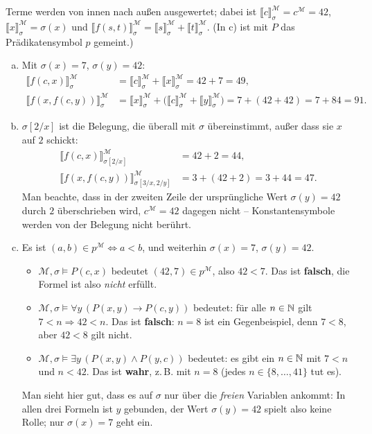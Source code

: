 \begin{loesung}
Terme werden von innen nach außen ausgewertet; dabei ist $\llbracket c\rrbracket^\mathcal{M}_\sigma=c^\mathcal{M}=42$, $\llbracket x\rrbracket^\mathcal{M}_\sigma=\sigma(x)$ und $\llbracket f(s,t)\rrbracket^\mathcal{M}_\sigma=\llbracket s\rrbracket^\mathcal{M}_\sigma+\llbracket t\rrbracket^\mathcal{M}_\sigma$. (In c) ist mit $P$ das Prädikatensymbol $p$ gemeint.)

\begin{enumerate}[a)]
  \item Mit $\sigma(x)=7$, $\sigma(y)=42$:
  \begin{align*}
    \llbracket f(c,x)\rrbracket^\mathcal{M}_\sigma &= \llbracket c\rrbracket^\mathcal{M}_\sigma+\llbracket x\rrbracket^\mathcal{M}_\sigma = 42+7 = 49,\\
    \llbracket f(x,f(c,y))\rrbracket^\mathcal{M}_\sigma &= \llbracket x\rrbracket^\mathcal{M}_\sigma+\bigl(\llbracket c\rrbracket^\mathcal{M}_\sigma+\llbracket y\rrbracket^\mathcal{M}_\sigma\bigr) = 7+(42+42) = 7+84 = 91.
  \end{align*}

  \item $\sigma[2/x]$ ist die Belegung, die überall mit $\sigma$ übereinstimmt, außer dass sie $x$ auf $2$ schickt:
  \begin{align*}
    \llbracket f(c,x)\rrbracket^\mathcal{M}_{\sigma[2/x]} &= 42+2 = 44,\\
    \llbracket f(x,f(c,y))\rrbracket^\mathcal{M}_{\sigma[3/x,2/y]} &= 3+(42+2) = 3+44 = 47.
  \end{align*}
  Man beachte, dass in der zweiten Zeile der ursprüngliche Wert $\sigma(y)=42$ durch $2$ überschrieben wird, $c^\mathcal{M}=42$ dagegen nicht -- Konstantensymbole werden von der Belegung nicht berührt.

  \item Es ist $(a,b)\in p^\mathcal{M}\Leftrightarrow a<b$, und weiterhin $\sigma(x)=7$, $\sigma(y)=42$.
  \begin{itemize}
    \item $\mathcal{M},\sigma\models P(c,x)$ bedeutet $(42,7)\in p^\mathcal{M}$, also $42<7$. Das ist \textbf{falsch}, die Formel ist also \emph{nicht} erfüllt.

    \item $\mathcal{M},\sigma\models\forall y\,(P(x,y)\to P(c,y))$ bedeutet: für alle $n\in\mathbb{N}$ gilt $7<n\Rightarrow 42<n$. Das ist \textbf{falsch}: $n=8$ ist ein Gegenbeispiel, denn $7<8$, aber $42<8$ gilt nicht.

    \item $\mathcal{M},\sigma\models\exists y\,(P(x,y)\wedge P(y,c))$ bedeutet: es gibt ein $n\in\mathbb{N}$ mit $7<n$ und $n<42$. Das ist \textbf{wahr}, z.\,B. mit $n=8$ (jedes $n\in\{8,\dots,41\}$ tut es).
  \end{itemize}
  Man sieht hier gut, dass es auf $\sigma$ nur über die \emph{freien} Variablen ankommt: In allen drei Formeln ist $y$ gebunden, der Wert $\sigma(y)=42$ spielt also keine Rolle; nur $\sigma(x)=7$ geht ein.
\end{enumerate}
\end{loesung}

